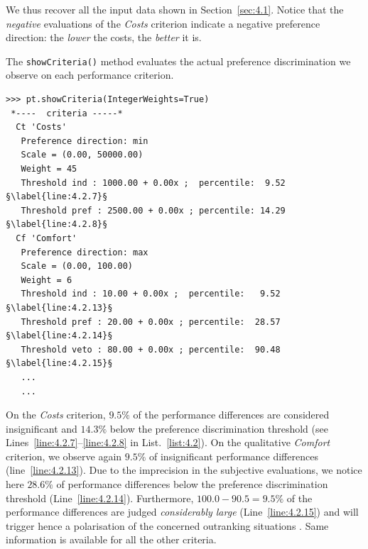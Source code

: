 We thus recover all the input data shown in Section~\ref{sec:4.1}. Notice that the \emph{negative} evaluations of the \emph{Costs} criterion indicate a negative preference direction: the \emph{lower} the costs, the \emph{better} it is.

The \texttt{showCriteria()} method evaluates the actual preference discrimination we observe on each performance criterion.
\begin{lstlisting}[caption={Inspecting the performance criteria.},label=list:4.2]
>>> pt.showCriteria(IntegerWeights=True)
 *----  criteria -----*
  Ct 'Costs'
   Preference direction: min
   Scale = (0.00, 50000.00)
   Weight = 45
   Threshold ind : 1000.00 + 0.00x ;  percentile:  9.52 §\label{line:4.2.7}§
   Threshold pref : 2500.00 + 0.00x ; percentile: 14.29 §\label{line:4.2.8}§
  Cf 'Comfort'
   Preference direction: max
   Scale = (0.00, 100.00)
   Weight = 6
   Threshold ind : 10.00 + 0.00x ;  percentile:   9.52 §\label{line:4.2.13}§
   Threshold pref : 20.00 + 0.00x ; percentile:  28.57 §\label{line:4.2.14}§
   Threshold veto : 80.00 + 0.00x ; percentile:  90.48 §\label{line:4.2.15}§
   ...
   ...
\end{lstlisting}

On the \emph{Costs} criterion, $9.5\%$ of the performance differences are considered insignificant and $14.3\%$ below the preference discrimination threshold (see Lines~\ref{line:4.2.7}--\ref{line:4.2.8} in List.~\vref{list:4.2}). On the qualitative \emph{Comfort} criterion, we observe again $9.5\%$ of insignificant performance differences (line~\ref{line:4.2.13}). Due to the imprecision in the subjective evaluations, we notice here $28.6\%$ of performance differences below the preference discrimination threshold (Line~\ref{line:4.2.14}). Furthermore, $100.0 - 90.5 = 9.5\%$ of the performance differences are judged \emph{considerably large} (Line~\ref{line:4.2.15}) and will trigger hence a polarisation of the concerned outranking situations \citep{BIS-2013}. Same information is available for all the other criteria. 
 
